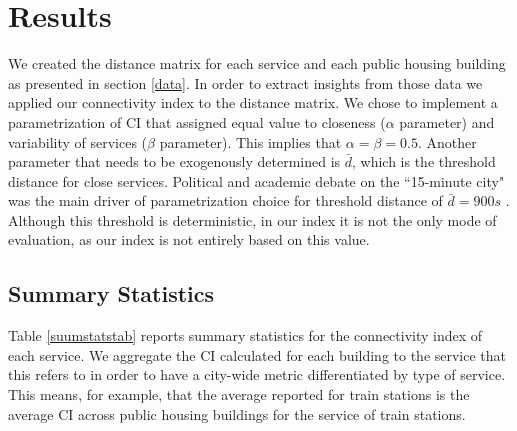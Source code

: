 \documentclass[12pt]{article}
\newcommand{\Tolerance}{0.0001}%
\begin{document}
 \begin{figure}
 	\centering
 \end{figure}

\section{Results}
\label{res}

We created the distance matrix for each service and each public housing building as presented in section \ref{data}. In order to extract insights from those data we applied our connectivity index to the distance matrix. We chose to implement a parametrization of CI that assigned equal value to closeness ($\alpha$ parameter) and variability of services ($\beta$ parameter). This implies that $\alpha=\beta=0.5$. Another parameter that needs to be exogenously determined is $\bar{d}$, which is the threshold distance for close services. Political and academic debate on the ``15-minute city" was the main driver of parametrization choice for threshold distance of $\bar{d}=900s$ \parencite{khavarian-garmsir_15-minute_2023}. Although this threshold is deterministic, in our index it is not the only mode of evaluation, as our index is not entirely based on this value.

\subsection{Summary Statistics}

Table \ref{suumstatstab} reports summary statistics for the connectivity index of each service. We aggregate the CI calculated for each building to the service that this refers to in order to have a city-wide metric differentiated by type of service. This means, for example, that the average reported for train stations is the average CI across public housing buildings for the service of train stations.
\end{document}
